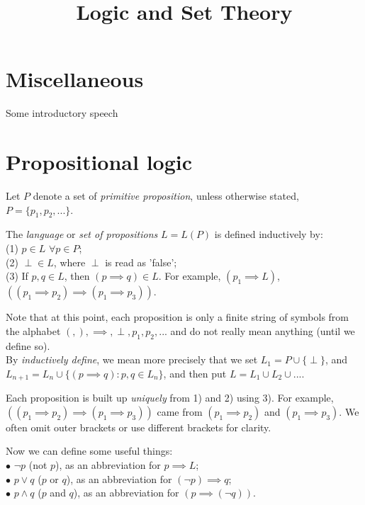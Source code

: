 \documentclass[a4paper]{article}
\begin{document}
\title{Logic and Set Theory}

\maketitle

\newpage

\tableofcontents

\newpage

\section{Miscellaneous}

Some introductory speech

\newpage

\section{Propositional logic}
Let $P$ denote a set of \emph{primitive proposition}, unless otherwise stated, $P=\{p_1,p_2,...\}$.

\begin{defi}
The \emph{language} or \emph{set of propositions} $L=L(P)$ is defined inductively by:\\
(1) $p \in L$ $\forall p \in P$;\\
(2) $\perp \in L$, where $\perp$ is read as 'false';\\
(3) If $p,q \in L$, then $(p \implies q) \in L$. For example, $(p_1 \implies L)$, $((p_1 \implies p_2) \implies (p_1 \implies p_3))$.
\end{defi}

Note that at this point, each proposition is only a finite string of symbols from the alphabet $(,),\implies,\perp,p_1,p_2,...$ and do not really mean anything (until we define so).\\
By \emph{inductively define}, we mean more precisely that we set $L_1 = P \cup \{\perp\}$, and $L_{n+1} = L_n \cup \{(p \implies q):p,q \in L_n\}$, and then put $L = L_1 \cup L_2 \cup ...$.

Each proposition is built up \emph{uniquely} from 1) and 2) using 3). For example, $((p_1 \implies p_2) \implies (p_1 \implies p_3))$ came from $(p_1 \implies p_2)$ and $(p_1 \implies p_3)$. We often omit outer brackets or use different brackets for clarity.

Now we can define some useful things:\\
$\bullet$ $\neg p$ (not $p$), as an abbreviation for $p \implies L$;\\
$\bullet$ $p \vee q$ ($p$ or $q$), as an abbreviation for $(\neg p) \implies q$;\\
$\bullet$ $p \wedge q$ ($p$ and $q$), as an abbreviation for $(p \implies (\neg q))$.
\end{document}
